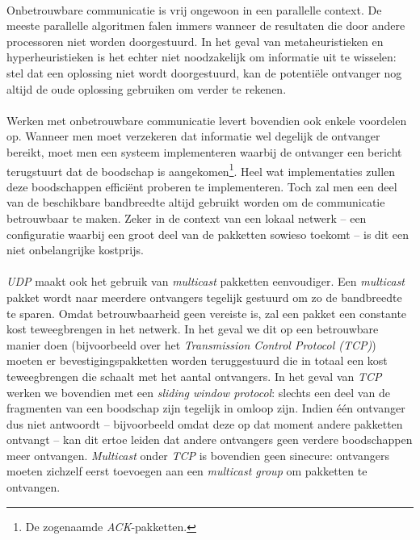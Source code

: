 \paragraph{}
Onbetrouwbare communicatie is vrij ongewoon in een parallelle context. De meeste parallelle algoritmen falen immers wanneer de resultaten die door andere processoren niet worden doorgestuurd. In het geval van metaheuristieken en hyperheuristieken is het echter niet noodzakelijk om informatie uit te wisselen: stel dat een oplossing niet wordt doorgestuurd, kan de potenti\"ele ontvanger nog altijd de oude oplossing gebruiken om verder te rekenen.

\paragraph{}
Werken met onbetrouwbare communicatie levert bovendien ook enkele voordelen op. Wanneer men moet verzekeren dat informatie wel degelijk de ontvanger bereikt, moet men een systeem implementeren waarbij de ontvanger een bericht terugstuurt dat de boodschap is aangekomen\footnote{De zogenaamde \emph{ACK}-pakketten.}. Heel wat implementaties zullen deze boodschappen effici\"ent proberen te implementeren. Toch zal men een deel van de beschikbare bandbreedte altijd gebruikt worden om de communicatie betrouwbaar te maken. Zeker in de context van een lokaal netwerk -- een configuratie waarbij een groot deel van de pakketten sowieso toekomt -- is dit een niet onbelangrijke kostprijs.

\paragraph{}
\emph{UDP} maakt ook het gebruik van \emph{multicast} pakketten eenvoudiger. Een \emph{multicast} pakket wordt naar meerdere ontvangers tegelijk gestuurd om zo de bandbreedte te sparen. Omdat betrouwbaarheid geen vereiste is, zal een pakket een constante kost teweegbrengen in het netwerk. In het geval we dit op een betrouwbare manier doen (bijvoorbeeld over het \emph{Transmission Control Protocol (TCP)}) moeten er bevestigingspakketten worden teruggestuurd die in totaal een kost teweegbrengen die schaalt met het aantal ontvangers. In het geval van \emph{TCP} werken we bovendien met een \emph{sliding window protocol}: slechts een deel van de fragmenten van een boodschap zijn tegelijk in omloop zijn. Indien \'e\'en ontvanger dus niet antwoordt -- bijvoorbeeld omdat deze op dat moment andere pakketten ontvangt -- kan dit ertoe leiden dat andere ontvangers geen verdere boodschappen meer ontvangen. \emph{Multicast} onder \emph{TCP} is bovendien geen sinecure\cite{dshp}: ontvangers moeten zichzelf eerst toevoegen aan een \emph{multicast group} om pakketten te ontvangen.

